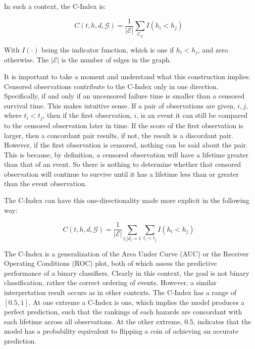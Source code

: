 
In such a context, the C-Index is:

$$ C(t, h, d, \mathcal{G}) = \frac{1}{\mathcal{|E|}} \sum_{\mathcal{E}_{ij}} I(h_i < h_j) $$

With $I(\cdot)$ being the indicator function, which is one if $h_i < h_j$, and zero otherwise. The $\mathcal{|E|}$ is the number of edges in the graph.

It is important to take a moment and understand what this construction implies. Censored observations contribute to the C-Index only in one direction. Specifically, if and only if an uncensored failure time is smaller than a censored survival time. This makes intuitive sense. If a pair of observations are given, $i,j$, where $t_i < t_j$, then if the first observation, $i$, is an event it can still be compared to the censored observation later in time. If the score of the first observation is larger, then a concordant pair results, if not, the result is a discordant pair. However, if the first observation is censored, nothing can be said about the pair. This is because, by definition, a censored observation will have a lifetime greater than that of an event. So there is nothing to determine whether that censored observation will continue to survive until it has a lifetime less than or greater than the event observation. 

The C-Index can have this one-directionality made more explicit in the following way\cite{Steck2008}:

$$ C(t, h, d, \mathcal{G}) = \frac{1}{\mathcal{|E|}} \sum_{t_{i}|d_i = 1} \sum_{t_i < t_j} I(h_i < h_j) $$

The C-Index is a generalization of the Area Under Curve (AUC) or the Receiver Operating Conditions (ROC) plot, both of which assess the predictive performance of a binary classifiers\cite{NEEDED}. Clearly in this context, the goal is not binary classification, rather the correct ordering of events. However, a similar interpretation result occurs as in other contexts. The C-Index has a range of $[0.5,1]$. At one extreme a C-Index is one, which implies the model produces a perfect prediction, such that the rankings of each hazards are concordant with each lifetime across all observations. At the other extreme, $0.5$, indicates that the model has a probability equivalent to flipping a coin of achieving an accurate prediction. 


